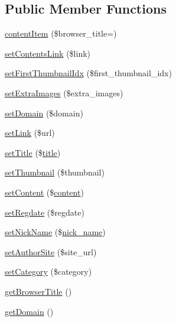 \subsection*{Public Member Functions}
\begin{DoxyCompactItemize}
\item 
\hyperlink{classcontentItem_a6d43634cb803585fa2a0feb13f63fad4}{content\+Item} (\$browser\+\_\+title=\textquotesingle{}\textquotesingle{})
\item 
\hyperlink{classcontentItem_afe78ae4ab14d74305c86d27570d9a7f8}{set\+Contents\+Link} (\$link)
\item 
\hyperlink{classcontentItem_ab18307a6068a6cdde94369976fe730f4}{set\+First\+Thumbnail\+Idx} (\$first\+\_\+thumbnail\+\_\+idx)
\item 
\hyperlink{classcontentItem_a8f635dff719c18bf5e969b13ca901c74}{set\+Extra\+Images} (\$extra\+\_\+images)
\item 
\hyperlink{classcontentItem_a61b6be878a0183cd1c3dfde8f29d5c20}{set\+Domain} (\$domain)
\item 
\hyperlink{classcontentItem_aad5f15eead8728ad5e2636740c4ff145}{set\+Link} (\$url)
\item 
\hyperlink{classcontentItem_a5a29426d7878c413cd6d63e930ce0a0f}{set\+Title} (\$\hyperlink{ko_8install_8php_a5b072c5fd1d2228c6ba5cee13cd142e3}{title})
\item 
\hyperlink{classcontentItem_a0145a758535658fa776871bfd675be15}{set\+Thumbnail} (\$thumbnail)
\item 
\hyperlink{classcontentItem_ad7355ad724398f4fbc79832241767405}{set\+Content} (\$\hyperlink{classcontent}{content})
\item 
\hyperlink{classcontentItem_abb2dad632dd405213708d5c211518c82}{set\+Regdate} (\$regdate)
\item 
\hyperlink{classcontentItem_ae3175aa0291e75bf95cb1220e50a33e4}{set\+Nick\+Name} (\$\hyperlink{ko_8install_8php_a151ecae87a1f3d7e257aa089803086bd}{nick\+\_\+name})
\item 
\hyperlink{classcontentItem_af28f4f40f1ac95cee2d88fe1e7d4b683}{set\+Author\+Site} (\$site\+\_\+url)
\item 
\hyperlink{classcontentItem_aa8ba578ae6629d632a42a76da823c59f}{set\+Category} (\$category)
\item 
\hyperlink{classcontentItem_a1590559deb019ba22a637cf78408f242}{get\+Browser\+Title} ()
\item 
\hyperlink{classcontentItem_a7a513d119938877566418029c6124a45}{get\+Domain} ()
\item 

\end{DoxyCompactItemize}
